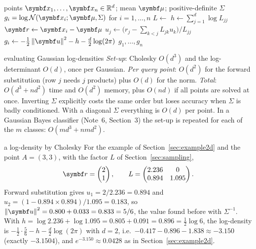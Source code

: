 \documentclass[11pt]{article}
\begin{document}
\begin{algorithm}[htbp]
\caption{Gaussian log-density of many points via Cholesky}\label{alg:logpdf}
\begin{algorithmic}[1]
\Require points $\x_1, \dots, \x_n \in \R^d$; mean $\vmu$; positive-definite $\Sigma$
\Ensure $g_i = \log\Normal(\x_i; \vmu, \Sigma)$ for $i = 1, \dots, n$
  \State $L \gets$  
  \State $h \gets \sum_{j=1}^d \log L_{jj}$ 
    \State $\vect{r} \gets \x_i - \vmu$
     
      \State $u_j \gets \big(r_j - \sum_{k<j} L_{jk}u_k\big)/L_{jj}$
    \EndFor
    \State $g_i \gets -\frac12\norm{\vect{u}}^2 - h - \frac d2\log(2\pi)$
  \EndFor
  \State \Return $g_1, \dots, g_n$
\EndFunction
\end{algorithmic}
\end{algorithm}

\begin{runtime}{evaluating Gaussian log-densities}
\emph{Set-up}: Cholesky $O(d^3)$ and the log-determinant $O(d)$, once per Gaussian. \emph{Per query point}: $O(d^2)$
for the forward substitution (row $j$ needs $j$ products) plus $O(d)$ for the norm. \emph{Total}: $O(d^3 + nd^2)$
time and $O(d^2)$ memory, plus $O(nd)$ if all points are solved at once. Inverting $\Sigma$ explicitly costs the same order but loses accuracy
when $\Sigma$ is badly conditioned. With a diagonal $\Sigma$ everything is $O(d)$ per point. In a Gaussian Bayes
classifier (Note~6, Section~3) the set-up is repeated for each of the $m$ classes: $O(md^3 + nmd^2)$.
\end{runtime}

\begin{worked}{a log-density by Cholesky}
For the example of Section~\ref{sec:example2d} and the point $A = (3, 3)$, with the factor $L$ of
Section~\ref{sec:sampling},
\[
  \vect{r} = \begin{pmatrix} 2 \\ 1 \end{pmatrix}, \qquad
  L = \begin{pmatrix} 2.236 & 0 \\ 0.894 & 1.095 \end{pmatrix}.
\]
Forward substitution gives $u_1 = 2/2.236 = 0.894$ and $u_2 = (1 - 0.894 \times 0.894)/1.095 = 0.183$, so
$\norm{\vect{u}}^2 = 0.800 + 0.033 = 0.833 = 5/6$, the value found before with $\Sigma^{-1}$. With $h = \log 2.236 +
\log 1.095 = 0.805 + 0.091 = 0.896 = \frac12\log 6$, the log-density is $-\frac12\cdot\frac56 - h - \frac d2\log(2\pi)$ with $d = 2$, i.e.\ $-0.417 -
0.896 - 1.838 \approx -3.150$ (exactly $-3.1504$), and $e^{-3.150} \approx 0.0428$ as in
Section~\ref{sec:example2d}.
\end{worked}
\end{document}
